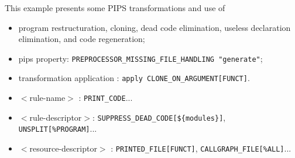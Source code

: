 \documentclass[a4paper]{article}
\begin{document}
This example presents some PIPS transformations and use of
\begin{itemize}
\item program restructuration, cloning, dead code elimination, useless
  declaration elimination, and code regeneration;
\item pips property: \verb+PREPROCESSOR_MISSING_FILE_HANDLING "generate"+;
\item transformation application : \verb+apply CLONE_ON_ARGUMENT[FUNCT]+.
\item $<$rule-name$>$ : \verb+PRINT_CODE+...
\item $<$rule-descriptor$>$:
  \verb+SUPPRESS_DEAD_CODE[${modules}]+,  \verb+UNSPLIT[%PROGRAM]+...
\item $<$resource-descriptor$>$ :  \verb+PRINTED_FILE[FUNCT]+,  \verb+CALLGRAPH_FILE[%ALL]+...
\end{itemize}
\end{document}
